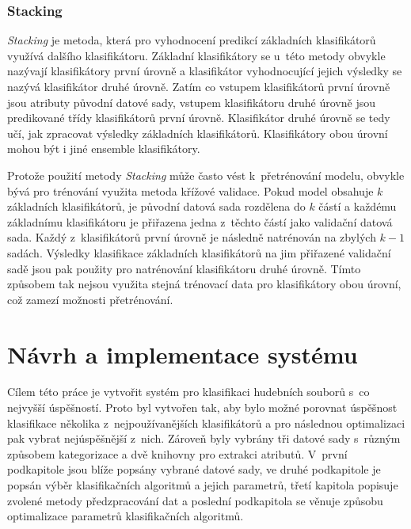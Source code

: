 \subsection*{Stacking}
\label{stacking}
\textit{Stacking} je metoda, která pro vyhodnocení predikcí základních klasifikátorů využívá dalšího klasifikátoru. Základní klasifikátory se u~této metody obvykle nazývají klasifikátory první úrovně a klasifikátor vyhodnocující jejich výsledky se nazývá klasifikátor druhé úrovně. Zatím co vstupem klasifikátorů první úrovně jsou atributy původní datové sady, vstupem klasifikátoru druhé úrovně jsou predikované třídy klasifikátorů první úrovně. Klasifikátor druhé úrovně se tedy učí, jak zpracovat výsledky základních klasifikátorů. Klasifikátory obou úrovní mohou být i jiné ensemble klasifikátory.\cite{data_classification}

Protože použití metody \textit{Stacking} může často vést k~přetrénování modelu, obvykle bývá pro trénování využita metoda křížové validace. Pokud model obsahuje $k$ základních klasifikátorů, je původní datová sada rozdělena do $k$ částí a každému základnímu klasifikátoru je přiřazena jedna z~těchto částí jako validační datová sada. Každý z~klasifikátorů první úrovně je následně natrénován na zbylých $k-1$ sadách. Výsledky klasifikace základních klasifikátorů na jim přiřazené validační sadě jsou pak použity pro natrénování klasifikátoru druhé úrovně. Tímto způsobem tak nejsou využita stejná trénovací data pro klasifikátory obou úrovní, což zamezí možnosti přetrénování.\cite{data_classification}
























\chapter{Návrh a implementace systému}
\label{navrh_a_implementace_systemu}
Cílem této práce je vytvořit systém pro klasifikaci hudebních souborů s~co nejvyšší úspěšností. Proto byl vytvořen tak, aby bylo možné porovnat úspěšnost klasifikace několika z~nejpoužívanějších klasifikátorů a pro následnou optimalizaci pak vybrat nejúspěšnější z~nich. Zároveň byly vybrány tři datové sady s~různým způsobem kategorizace a dvě knihovny pro extrakci atributů. V~první podkapitole jsou blíže popsány vybrané datové sady, ve druhé podkapitole je popsán výběr klasifikačních algoritmů a jejich parametrů, třetí kapitola popisuje zvolené metody předzpracování dat a poslední podkapitola se věnuje způsobu optimalizace parametrů klasifikačních algoritmů.

